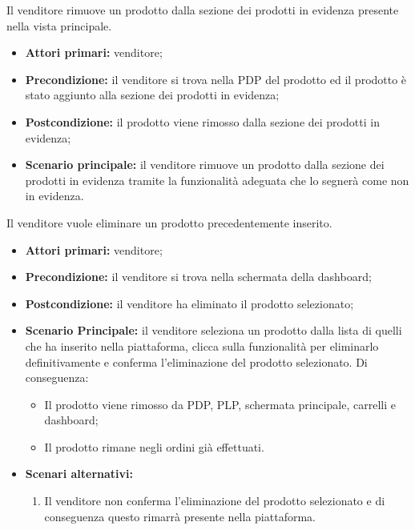 \label{rimozione-prodotto-evidenza}

Il venditore rimuove un prodotto dalla sezione dei prodotti in evidenza presente nella vista principale.
\begin{itemize}
    \item \textbf{Attori primari:} venditore;
    \item \textbf{Precondizione:} il venditore si trova nella PDP del prodotto ed il prodotto è stato aggiunto alla sezione dei prodotti in evidenza;
    \item \textbf{Postcondizione:} il prodotto viene rimosso dalla sezione dei prodotti in evidenza; 
    \item \textbf{Scenario principale:} il venditore rimuove un prodotto dalla sezione dei prodotti in evidenza tramite la funzionalità adeguata che lo segnerà come non in evidenza.
\end{itemize}

\label{eliminazione-prodotto}


Il venditore vuole eliminare un prodotto precedentemente inserito.
\begin{itemize}
    \item \textbf{Attori primari:} venditore;
    \item \textbf{Precondizione:} il venditore si trova nella schermata della dashboard;
    \item \textbf{Postcondizione:} il venditore ha eliminato il prodotto selezionato;
    \item \textbf{Scenario Principale:} il venditore seleziona un prodotto dalla lista di quelli che ha inserito nella piattaforma, clicca sulla funzionalità per eliminarlo definitivamente e conferma l'eliminazione del prodotto selezionato. Di conseguenza:
    \begin{itemize}
    	\item Il prodotto viene rimosso da PDP, PLP, schermata principale, carrelli e dashboard;
    	\item Il prodotto rimane negli ordini già effettuati.
    \end{itemize}
	\item \textbf{Scenari alternativi:}
	\begin{enumerate}[label=\lett]
		\item Il venditore non conferma l'eliminazione del prodotto selezionato e di conseguenza questo rimarrà presente nella piattaforma.
	\end{enumerate}
\end{itemize}

